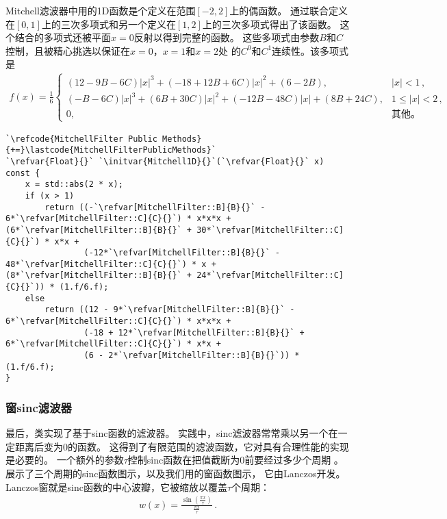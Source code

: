 Mitchell滤波器中用的1D函数是个定义在范围$[-2,2]$上的偶函数。
通过联合定义在$[0,1]$上的三次多项式和另一个定义在$[1,2]$上的三次多项式得出了该函数。
这个结合的多项式还被平面$x=0$反射以得到完整的函数。
这些多项式由参数$B$和$C$控制，且被精心挑选以保证在$x=0$，$x=1$和$x=2$处
的$C^0$和$C^1$连续性。该多项式是
\begin{align*}
    f(x)=\frac{1}{6}\left\{
    \begin{array}{ll}
        (12-9B-6C)|x|^3+(-18+12B+6C)|x|^2+(6-2B),          & |x|<1\, ,      \\
        (-B-6C)|x|^3+(6B+30C)|x|^2+(-12B-48C)|x|+(8B+24C), & 1\le |x|<2\, , \\
        0,                                                 & \text{其他。}
    \end{array}
    \right.
\end{align*}

\begin{lstlisting}
`\refcode{MitchellFilter Public Methods}{+=}\lastcode{MitchellFilterPublicMethods}`
`\refvar{Float}{}` `\initvar{Mitchell1D}{}`(`\refvar{Float}{}` x) const {
    x = std::abs(2 * x);
    if (x > 1)
        return ((-`\refvar[MitchellFilter::B]{B}{}` - 6*`\refvar[MitchellFilter::C]{C}{}`) * x*x*x + (6*`\refvar[MitchellFilter::B]{B}{}` + 30*`\refvar[MitchellFilter::C]{C}{}`) * x*x +
                (-12*`\refvar[MitchellFilter::B]{B}{}` - 48*`\refvar[MitchellFilter::C]{C}{}`) * x + (8*`\refvar[MitchellFilter::B]{B}{}` + 24*`\refvar[MitchellFilter::C]{C}{}`)) * (1.f/6.f);
    else
        return ((12 - 9*`\refvar[MitchellFilter::B]{B}{}` - 6*`\refvar[MitchellFilter::C]{C}{}`) * x*x*x + 
                (-18 + 12*`\refvar[MitchellFilter::B]{B}{}` + 6*`\refvar[MitchellFilter::C]{C}{}`) * x*x +
                (6 - 2*`\refvar[MitchellFilter::B]{B}{}`)) * (1.f/6.f);
}
\end{lstlisting}

\subsubsection*{窗sinc滤波器}
最后，类实现了基于sinc函数的滤波器。
实践中，sinc滤波器常常乘以另一个在一定距离后变为0的函数。
这得到了有限范围的滤波函数，它对具有合理性能的实现是必要的。
一个额外的参数$\tau$控制sinc函数在把值截断为0前要经过多少个周期
。
展示了三个周期的sinc函数图示，以及我们用的窗函数图示，
它由Lanczos开发。Lanczos窗就是sinc函数的中心波瓣，它被缩放以覆盖$\tau$个周期：
\begin{align*}
    w(x)=\frac{\sin\left(\displaystyle\frac{\pi x}{\tau}\right)}{\displaystyle\frac{\pi x}{\tau}}\, .
\end{align*}

